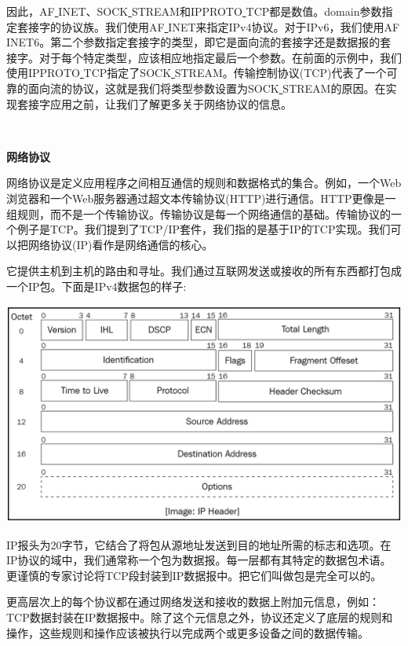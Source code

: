 因此，AF\underline{ }INET、SOCK\underline{ }STREAM和IPPROTO\underline{ }TCP都是数值。domain参数指定套接字的协议族。我们使用AF\underline{ }INET来指定IPv4协议。对于IPv6，我们使用AF\underline{ }INET6。第二个参数指定套接字的类型，即它是面向流的套接字还是数据报的套接字。对于每个特定类型，应该相应地指定最后一个参数。在前面的示例中，我们使用IPPROTO\underline{ }TCP指定了SOCK\underline{ }STREAM。传输控制协议(TCP)代表了一个可靠的面向流的协议，这就是我们将类型参数设置为SOCK\underline{ }STREAM的原因。在实现套接字应用之前，让我们了解更多关于网络协议的信息。 \par

\noindent\textbf{}\ \par
\textbf{网络协议} \ \par
网络协议是定义应用程序之间相互通信的规则和数据格式的集合。例如，一个Web浏览器和一个Web服务器通过超文本传输协议(HTTP)进行通信。HTTP更像是一组规则，而不是一个传输协议。传输协议是每一个网络通信的基础。传输协议的一个例子是TCP。我们提到了TCP/IP套件，我们指的是基于IP的TCP实现。我们可以把网络协议(IP)看作是网络通信的核心。 \par
它提供主机到主机的路由和寻址。我们通过互联网发送或接收的所有东西都打包成一个IP包。下面是IPv4数据包的样子: \par

\begin{center}
	\includegraphics[width=1.0\textwidth]{content/Section-2/Chapter-12/6}
\end{center}

IP报头为20字节，它结合了将包从源地址发送到目的地址所需的标志和选项。在IP协议的域中，我们通常称一个包为数据报。每一层都有其特定的数据包术语。更谨慎的专家讨论将TCP段封装到IP数据报中。把它们叫做包是完全可以的。 \par
更高层次上的每个协议都在通过网络发送和接收的数据上附加元信息，例如：TCP数据封装在IP数据报中。除了这个元信息之外，协议还定义了底层的规则和操作，这些规则和操作应该被执行以完成两个或更多设备之间的数据传输。 \par

